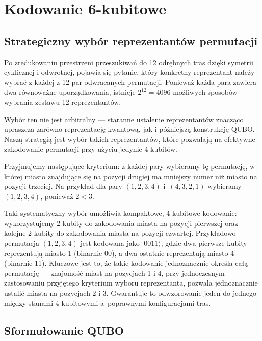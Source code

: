
\section{Kodowanie 6-kubitowe}
\subsection{Strategiczny wybór reprezentantów permutacji}

Po zredukowaniu przestrzeni przeszukiwań do 12 odrębnych tras dzięki symetrii cyklicznej i odwrotnej, pojawia się pytanie, który konkretny reprezentant należy wybrać z każdej z 12 par odwracanych permutacji. Ponieważ każda para zawiera dwa równoważne uporządkowania, istnieje $2^{12} = 4096$ możliwych sposobów wybrania zestawu 12 reprezentantów.

Wybór ten nie jest arbitralny — staranne ustalenie reprezentantów znacząco upraszcza zarówno reprezentację kwantową, jak i późniejszą konstrukcję QUBO. Naszą strategią jest wybór takich reprezentantów, które pozwalają na efektywne zakodowanie permutacji przy użyciu jedynie 4 kubitów.

Przyjmujemy następujące kryterium: z każdej pary wybieramy tę permutację, w której miasto znajdujące się na pozycji drugiej ma mniejszy numer niż miasto na pozycji trzeciej. Na przykład dla pary $(1, 2, 3, 4)$ i~$(4, 3, 2, 1)$ wybieramy $(1, 2, 3, 4)$, ponieważ $2 < 3$.

Taki systematyczny wybór umożliwia kompaktowe, 4-kubitowe kodowanie: wykorzystujemy 2 kubity do zakodowania miasta na pozycji pierwszej oraz kolejne 2 kubity do zakodowania miasta na pozycji czwartej. Przykładowo permutacja $(1, 2, 3, 4)$ jest kodowana jako $|0011\rangle$, gdzie dwa pierwsze kubity reprezentują miasto 1 (binarnie 00), a dwa ostatnie reprezentują miasto 4 (binarnie 11). Kluczowe jest to, że takie kodowanie jednoznacznie określa całą permutację — znajomość miast na pozycjach 1 i 4, przy jednoczesnym zastosowaniu przyjętego kryterium wyboru reprezentanta, pozwala jednoznacznie ustalić miasta na pozycjach 2 i 3. Gwarantuje to odwzorowanie jeden-do-jednego między stanami 4-kubitowymi a~poprawnymi konfiguracjami tras.

\subsection{Sformułowanie QUBO}

